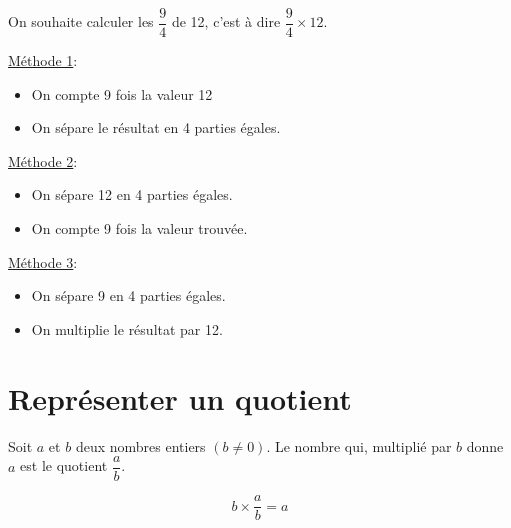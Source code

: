 \documentclass[a4paper]{book}
\begin{document}
    \begin{methode}
        On souhaite calculer les $\dfrac{9}{4}$ de 12, c'est à dire $\dfrac{9}{4}\times12$.

        \medskip

        \begin{minipage}{0.32\linewidth}
            \underline{Méthode 1}:
            \begin{itemize}[leftmargin=*]
                \item On compte 9 fois la valeur 12
                \item On sépare le résultat en 4 parties égales.
            \end{itemize}

            \vspace{2cm}
        \end{minipage}
        \hfill\vline\hfill
        \begin{minipage}{0.32\linewidth}
            \underline{Méthode 2}:
            \begin{itemize}[leftmargin=*]
                \item On sépare 12 en 4 parties égales.
                \item On compte 9 fois la valeur trouvée.
            \end{itemize}

            \vspace{2cm}
        \end{minipage}
        \hfill\vline\hfill
        \begin{minipage}{0.32\linewidth}
            \underline{Méthode 3}:
            \begin{itemize}[leftmargin=*]
                \item On sépare 9 en 4 parties égales.
                \item On multiplie le résultat par 12.

            \end{itemize}

            \vspace{2cm}
        \end{minipage}
    \end{methode}
    

\section{Représenter un quotient}
    \begin{definition}
        Soit $a$ et $b$ deux nombres entiers $(b\neq 0)$. 
        Le nombre qui, multiplié par $b$ donne $a$ est le quotient $\dfrac{a}{b}$.

        \[b\times\boxed{\dfrac{a}{b}}=a\]
    \end{definition}
\end{document}
